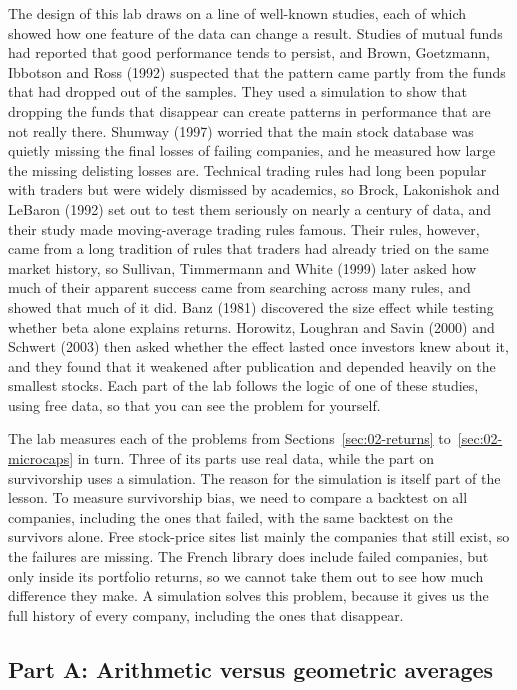 The design of this lab draws on a line of well-known studies, each of which showed how one feature of the data can change a result. Studies of mutual funds had reported that good performance tends to persist, and Brown, Goetzmann, Ibbotson and Ross (1992) suspected that the pattern came partly from the funds that had dropped out of the samples. They used a simulation to show that dropping the funds that disappear can create patterns in performance that are not really there. Shumway (1997) worried that the main stock database was quietly missing the final losses of failing companies, and he measured how large the missing delisting losses are. Technical trading rules had long been popular with traders but were widely dismissed by academics, so Brock, Lakonishok and LeBaron (1992) set out to test them seriously on nearly a century of data, and their study made moving-average trading rules famous. Their rules, however, came from a long tradition of rules that traders had already tried on the same market history, so Sullivan, Timmermann and White (1999) later asked how much of their apparent success came from searching across many rules, and showed that much of it did. Banz (1981) discovered the size effect while testing whether beta alone explains returns. Horowitz, Loughran and Savin (2000) and Schwert (2003) then asked whether the effect lasted once investors knew about it, and they found that it weakened after publication and depended heavily on the smallest stocks. Each part of the lab follows the logic of one of these studies, using free data, so that you can see the problem for yourself.

The lab measures each of the problems from Sections~\ref{sec:02-returns} to~\ref{sec:02-microcaps} in turn. Three of its parts use real data, while the part on survivorship uses a simulation. 
The reason for the simulation is itself part of the lesson. To measure survivorship bias, we need to compare a backtest on all companies, including the ones that failed, with the same backtest on the survivors alone. Free stock-price sites list mainly the companies that still exist, so the failures are missing. The French library does include failed companies, but only inside its portfolio returns, so we cannot take them out to see how much difference they make. A simulation solves this problem, because it gives us the full history of every company, including the ones that disappear.


\subsection*{Part A: Arithmetic versus geometric averages}


